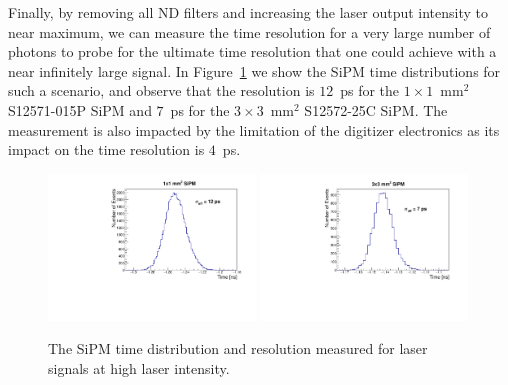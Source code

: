 Finally, by removing all ND filters and increasing the laser output intensity to near 
maximum, we can measure the time resolution for a very large number of photons 
to probe for the ultimate time resolution that one could achieve with a near 
infinitely large signal. In Figure~\ref{fig:LargeLightTimeResolution} we show 
the SiPM time distributions for such a scenario, and observe that the resolution 
is $12$~ps for the $1\times1$~$\mathrm{mm}^{2}$  S12571-015P SiPM and
$7$~ps for the $3\times 3$~$\mathrm{mm}^{2}$ S12572-25C SiPM. 
The measurement is also impacted by the limitation
of the digitizer electronics as its impact on the time resolution is $4$~ps. 

\begin{figure}[htbp] 
\centering
\includegraphics[width=0.49\textwidth]{figures/DeltaT_LargeNPhotons_1x1SiPM.pdf} 
\includegraphics[width=0.49\textwidth]{figures/DeltaT_LargeNPhotons_3x3SiPM.pdf} 
\caption{The SiPM time distribution and resolution measured for laser signals at high laser intensity.} 
\label{fig:LargeLightTimeResolution} 
\end{figure} 

